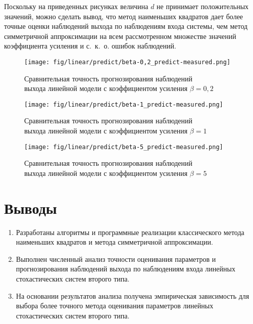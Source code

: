 Поскольку на приведенных рисунках величина \( d \) не принимает положительных значений,
можно сделать вывод, что метод наименьших квадратов дает более точные оценки
наблюдений выхода по наблюдениям входа системы, чем метод симметричной аппроксимации
на всем рассмотренном множестве значений коэффициента усиления и с.~к.~о. ошибок наблюдений.

\begin{figure}[h]
  \centering
  \texttt{[image: fig/linear/predict/beta-0,2\_predict-measured.png]}
  \caption{%
    Сравнительная точность прогнозирования наблюдений \\
    выхода линейной модели с коэффициентом усиления \( \beta = 0{,}2 \)
  }\label{fig:comparison_linear_predict_beta-0,2}
\end{figure}

\begin{figure}[p]
  \centering
  \texttt{[image: fig/linear/predict/beta-1\_predict-measured.png]}
  \caption{%
    Сравнительная точность прогнозирования наблюдений \\
    выхода линейной модели с коэффициентом усиления \( \beta = 1 \)
  }\label{fig:comparison_linear_predict_beta-1}
\end{figure}

\begin{figure}[p]
  \centering
  \texttt{[image: fig/linear/predict/beta-5\_predict-measured.png]}
  \caption{%
    Сравнительная точность прогнозирования наблюдений \\
    выхода линейной модели с коэффициентом усиления \( \beta = 5 \)
  }\label{fig:comparison_linear_predict_beta-5}
\end{figure}

\vspace{2\baselineskip}
\section{Выводы}

\begin{enumerate}
\item Разработаны алгоритмы и программные реализации классического
  метода наименьших квадратов и метода симметричной аппроксимации.
\item Выполнен численный анализ точности оценивания параметров и
  прогнозирования наблюдений выхода по наблюдениям входа линейных
  стохастических систем второго типа.
\item На основании результатов анализа получена эмпирическая зависимость
  для выбора более точного метода оценивания параметров линейных стохастических
  систем второго типа.
\end{enumerate}
